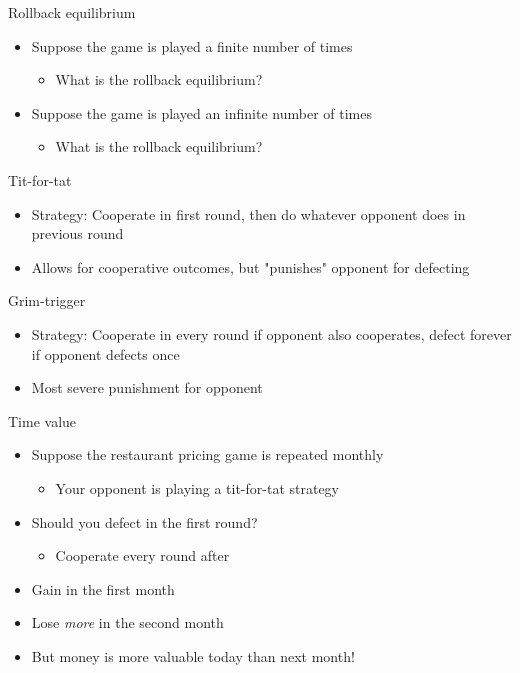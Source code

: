 \documentclass[10pt]{beamer}
\begin{document}
\begin{frame}[label={sec:orgf21b2b9}]{}
\alert{Rollback equilibrium}
\begin{itemize}
\item Suppose the game is played a finite number of times
\begin{itemize}
\item What is the rollback equilibrium?
\end{itemize}
\item Suppose the game is played an infinite number of times
\begin{itemize}
\item What is the rollback equilibrium?
\end{itemize}
\end{itemize}
\end{frame}

\begin{frame}[label={sec:orgbf58669}]{}
\alert{Tit-for-tat}
\begin{itemize}
\item Strategy: Cooperate in first round, then do whatever opponent does in previous round
\item Allows for cooperative outcomes, but "punishes" opponent for defecting
\end{itemize}
\end{frame}

\begin{frame}[label={sec:org68e5daa}]{}
\alert{Grim-trigger}
\begin{itemize}
\item Strategy: Cooperate in every round if opponent also cooperates, defect forever if opponent defects once
\item Most severe punishment for opponent
\end{itemize}
\end{frame}

\begin{frame}[label={sec:org2900518}]{}
\alert{Time value}
\begin{itemize}
\item Suppose the restaurant pricing game is repeated monthly
\begin{itemize}
\item Your opponent is playing a tit-for-tat strategy
\end{itemize}
\item Should you defect in the first round?
\begin{itemize}
\item Cooperate every round after
\end{itemize}
\item Gain in the first month
\item Lose \emph{more} in the second month
\item But money is more valuable today than next month!
\end{itemize}
\end{frame}
\end{document}
